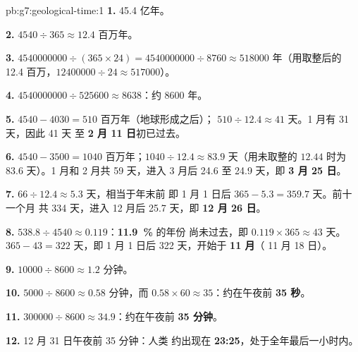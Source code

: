 \begin{solution}{pb:g7:geological-time:1}
\textbf{1.} 45.4 亿年。

\textbf{2.} $4540 \div 365 \approx 12.4$ 百万年。

\textbf{3.} $\num{4540000000} \div (365 \times 24) = \num{4540000000}
\div 8760 \approx \num{518000}$ 年（用取整后的 \num{12.4}
百万，$\num{12400000} \div 24 \approx \num{517000}$）。

\textbf{4.} $\num{4540000000} \div \num{525600} \approx 8638$：约
\num{8600} 年。

\textbf{5.} $4540 - 4030 = 510$ 百万年（地球形成之后）；
$510 \div 12.4 \approx 41$ 天。1 月有 31 天，因此 41 天
至 \textbf{2 月 11 日}初已过去。

\textbf{6.} $4540 - 3500 = 1040$ 百万年；$1040 \div 12.4 \approx
83.9$ 天（用未取整的 $12.44$ 时为 83.6 天）。1 月和 2 月共
59 天，进入 3 月后 24.6 至 24.9 天，即 \textbf{3 月 25 日}。

\textbf{7.} $66 \div 12.4 \approx 5.3$ 天，相当于年末前
即 1 月 1 日后 $365 - 5.3 = 359.7$ 天。前十一个月
共 334 天，进入 12 月后 25.7 天，即 \textbf{12 月 26 日}。

\textbf{8.} $538.8 \div 4540 \approx 0.119$：\textbf{11.9~\%} 的年份
尚未过去，即 $0.119 \times 365 \approx 43$ 天。$365 - 43 =
322$ 天，即 1 月 1 日后 322 天，开始于 \textbf{11 月}（
11 月 18 日）。

\textbf{9.} $\num{10000} \div 8600 \approx 1.2$ 分钟。

\textbf{10.} $5000 \div 8600 \approx 0.58$ 分钟，而 $0.58 \times 60
\approx 35$：约在午夜前 \textbf{35 秒}。

\textbf{11.} $\num{300000} \div 8600 \approx 34.9$：约在午夜前 \textbf{35
分钟}。

\textbf{12.} 12 月 31 日午夜前 35 分钟：人类
约出现在 \textbf{23:25}，处于全年最后一小时内。
\end{solution}
